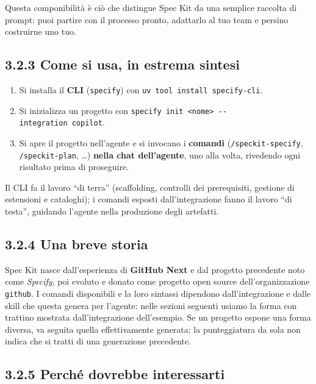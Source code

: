 \documentclass[
  italian,
  10pt,
]{book}
\providecommand{\tightlist}{%
  \setlength{\itemsep}{0pt}\setlength{\parskip}{0pt}}
\begin{document}
Questa componibilità è ciò che distingue Spec Kit da una semplice
raccolta di prompt: puoi partire con il processo pronto, adattarlo al
tuo team e persino costruirne uno tuo.

\subsection{3.2.3 Come si usa, in estrema
sintesi}\label{come-si-usa-in-estrema-sintesi}

\begin{enumerate}
\def\labelenumi{\arabic{enumi}.}
\tightlist
\item
  Si installa il \textbf{CLI} (\texttt{specify}) con
  \texttt{uv\ tool\ install\ specify-cli}.
\item
  Si inizializza un progetto con
  \texttt{specify\ init\ \textless{}nome\textgreater{}\ -\/-integration\ copilot}.
\item
  Si apre il progetto nell'agente e si invocano i \textbf{comandi}
  (\texttt{/speckit-specify}, \texttt{/speckit-plan}, \ldots)
  \textbf{nella chat dell'agente}, uno alla volta, rivedendo ogni
  risultato prima di proseguire.
\end{enumerate}

Il CLI fa il lavoro ``di terra'' (scaffolding, controlli dei
prerequisiti, gestione di estensioni e cataloghi); i comandi esposti
dall'integrazione fanno il lavoro ``di testa'', guidando l'agente nella
produzione degli artefatti.

\subsection{3.2.4 Una breve storia}\label{una-breve-storia}

Spec Kit nasce dall'esperienza di \textbf{GitHub Next} e dal progetto
precedente noto come \emph{Specify}, poi evoluto e donato come progetto
open source dell'organizzazione \texttt{github}. I comandi disponibili e
la loro sintassi dipendono dall'integrazione e dalle skill che questa
genera per l'agente: nelle sezioni seguenti usiamo la forma con trattino
mostrata dall'integrazione dell'esempio. Se un progetto espone una forma
diversa, va seguita quella effettivamente generata; la punteggiatura da
sola non indica che si tratti di una generazione precedente.

\subsection{3.2.5 Perché dovrebbe
interessarti}\label{perchuxe9-dovrebbe-interessarti}
\end{document}

